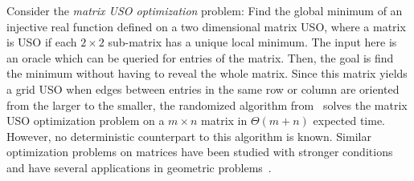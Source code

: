 \documentclass[runningheads,a4paper]{llncs}
\newcommand{\AT}[1]{\marginpar{\parbox{3.6cm}{{\small {\bf AT:} #1}}}} %
\begin{document}




Consider the %
\emph{matrix USO optimization} problem: Find the global minimum of an injective real function defined on a two dimensional matrix USO, where a matrix is USO 
if each $2\times 2$ sub-matrix has a unique local minimum. 
The input here is an oracle which can be queried for entries of the matrix. Then, the goal is find the minimum without having to reveal the whole matrix.
Since this matrix yields a grid USO when edges between entries in the same row or column are oriented from the larger to the smaller, the randomized algorithm from~\citet{grid08} solves the matrix USO optimization problem on a $m\times n$ matrix in $\Theta(m+n)$ expected time. However, no deterministic counterpart to this algorithm is known. 
Similar optimization problems on matrices have been studied with stronger conditions and have several applications in geometric problems~\cite{aggarwal1987geometric,demaine2005optimizing,galil1992dynamic,mityagin2003complexity}.
\end{document}
